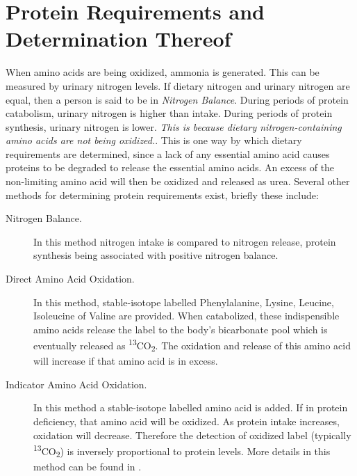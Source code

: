 \documentclass{tufte-handout}
\begin{document}
\section{Protein Requirements and Determination Thereof}
When amino acids are being oxidized, ammonia is generated. This can be measured by urinary nitrogen levels.  If dietary nitrogen and urinary nitrogen are equal, then a person is said to be in \emph{Nitrogen Balance}.  During periods of protein catabolism, urinary nitrogen is higher than intake.  During periods of protein synthesis, urinary nitrogen is lower.  \emph{This is because dietary nitrogen-containing amino acids are not being oxidized.}.  This is one way by which dietary requirements are determined, since a lack of any essential amino acid causes proteins to be degraded to release the essential amino acids.  An excess of the non-limiting amino acid will then be oxidized and released as urea.  Several other methods for determining protein requirements exist, briefly these include:

\begin{description}
\item [Nitrogen Balance.]  In this method nitrogen intake is compared to nitrogen release, protein synthesis being associated with positive nitrogen balance.
\item [Direct Amino Acid Oxidation.]  In this method, stable-isotope labelled Phenylalanine, Lysine, Leucine, Isoleucine of Valine are provided.   When catabolized, these indispensible amino acids release the label to the body's bicarbonate pool which is eventually released as \textsuperscript{13}CO\textsubscript{2}.  The oxidation and release of this amino acid will increase if that amino acid is in excess.
\item [Indicator Amino Acid Oxidation.] In this method a stable-isotope labelled amino acid is added.  If in protein deficiency, that amino acid will be oxidized.  As protein intake increases, oxidation will decrease.  Therefore the detection of oxidized label (typically \textsuperscript{13}CO\textsubscript{2}) is inversely proportional to protein levels.  More details in this method can be found in \citet{Elango2008}.
\end{description}


\end{document}
